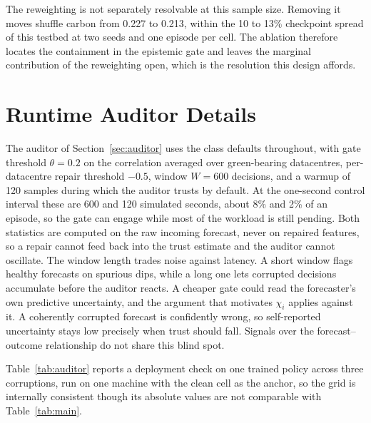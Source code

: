 \documentclass{article} %
\begin{document}
The reweighting is not separately resolvable at this sample size. Removing it moves shuffle carbon from 0.227 to 0.213, within the 10 to 13\% checkpoint spread of this testbed at two seeds and one episode per cell. The ablation therefore locates the containment in the epistemic gate and leaves the marginal contribution of the reweighting open, which is the resolution this design affords.


\section{Runtime Auditor Details}
\label{app:auditor}

The auditor of Section~\ref{sec:auditor} uses the class defaults throughout, with gate threshold $\theta{=}0.2$ on the correlation averaged over green-bearing datacentres, per-datacentre repair threshold $-0.5$, window $W{=}600$ decisions, and a warmup of 120 samples during which the auditor trusts by default. At the one-second control interval these are 600 and 120 simulated seconds, about 8\% and 2\% of an episode, so the gate can engage while most of the workload is still pending. Both statistics are computed on the raw incoming forecast, never on repaired features, so a repair cannot feed back into the trust estimate and the auditor cannot oscillate. The window length trades noise against latency. A short window flags healthy forecasts on spurious dips, while a long one lets corrupted decisions accumulate before the auditor reacts. A cheaper gate could read the forecaster's own predictive uncertainty, and the argument that motivates $\chi_i$ applies against it. A coherently corrupted forecast is confidently wrong, so self-reported uncertainty stays low precisely when trust should fall. Signals over the forecast--outcome relationship do not share this blind spot.

Table~\ref{tab:auditor} reports a deployment check on one trained policy across three corruptions, run on one machine with the clean cell as the anchor, so the grid is internally consistent though its absolute values are not comparable with Table~\ref{tab:main}.
\end{document}
